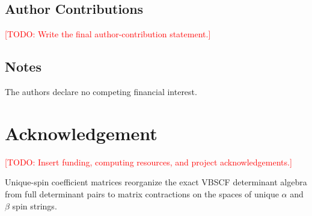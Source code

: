 \documentclass[journal=jctcce,manuscript=article]{achemso}
\newcommand{\todo}[1]{\textcolor{red}{[TODO: #1]}}
\begin{document}
\subsection*{Author Contributions}
\todo{Write the final author-contribution statement.}

\subsection*{Notes}
The authors declare no competing financial interest.

\section*{Acknowledgement}
\todo{Insert funding, computing resources, and project acknowledgements.}

\begin{tocentry}
\centering
\fbox{\rule{0pt}{1.6in}\rule{0.9\linewidth}{0pt}}

\vspace{0.5em}
\small
Unique-spin coefficient matrices reorganize the exact VBSCF determinant algebra
from full determinant pairs to matrix contractions on the spaces of unique
$\alpha$ and $\beta$ spin strings.
\end{tocentry}
\end{document}
